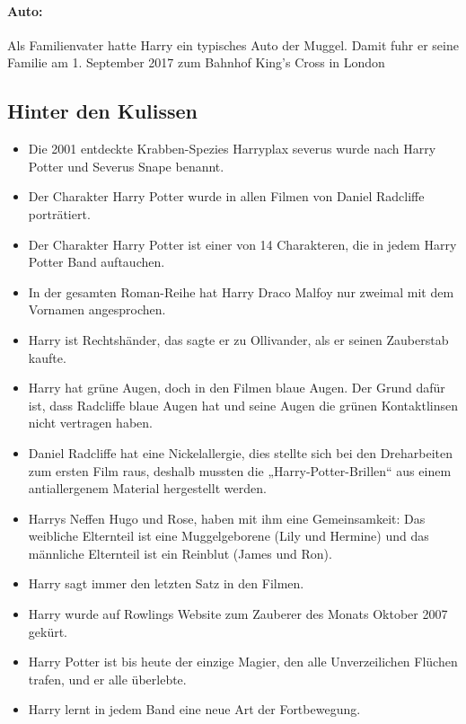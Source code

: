 \documentclass[a4paper, 10pt]{article}
\begin{document}
\paragraph{Auto:}
Als Familienvater hatte Harry ein typisches Auto der Muggel. Damit fuhr er seine Familie am 1. September 2017 zum Bahnhof King's Cross in London
\subsection*{\Large Hinter den Kulissen}
\vspace{10pt}
\begin{itemize}
    \item Die 2001 entdeckte Krabben-Spezies Harryplax severus wurde nach Harry Potter und Severus Snape benannt.
    \item Der Charakter Harry Potter wurde in allen Filmen von Daniel Radcliffe porträtiert.
    \item Der Charakter Harry Potter ist einer von 14 Charakteren, die in jedem Harry Potter Band auftauchen.
    \item In der gesamten Roman-Reihe hat Harry Draco Malfoy nur zweimal mit dem Vornamen angesprochen.
    \item Harry ist Rechtshänder, das sagte er zu Ollivander, als er seinen Zauberstab kaufte.
    \item Harry hat grüne Augen, doch in den Filmen blaue Augen. Der Grund dafür ist, dass Radcliffe blaue Augen hat und seine Augen die grünen Kontaktlinsen nicht vertragen haben.
    \item Daniel Radcliffe hat eine Nickelallergie, dies stellte sich bei den Dreharbeiten zum ersten Film raus, deshalb mussten die „Harry-Potter-Brillen“ aus einem antiallergenem Material hergestellt werden.
    \item Harrys Neffen Hugo und Rose, haben mit ihm eine Gemeinsamkeit: Das weibliche Elternteil ist eine Muggelgeborene (Lily und Hermine) und das männliche Elternteil ist ein Reinblut (James und Ron).
    \item Harry sagt immer den letzten Satz in den Filmen.
    \item Harry wurde auf Rowlings Website zum Zauberer des Monats Oktober 2007 gekürt.
    \item Harry Potter ist bis heute der einzige Magier, den alle Unverzeilichen Flüchen trafen, und er alle überlebte.
    \item Harry lernt in jedem Band eine neue Art der Fortbewegung.
    \begin{itemize}

\end{itemize}
\end{itemize}
\end{document}
